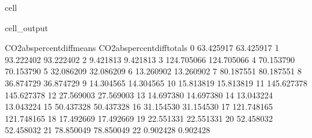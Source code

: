 \documentclass[letterpaper,10pt,english]{jupyterBook}
\begin{document}
\begin{sphinxuseclass}{cell}
\begin{sphinxVerbatimOutput}
\begin{sphinxuseclass}{cell_output}
\begin{sphinxVerbatim}[commandchars=\\\{\}]
    CO2\PYGZus{}abs\PYGZus{}percent\PYGZus{}diff\PYGZus{}means  CO2\PYGZus{}abs\PYGZus{}percent\PYGZus{}diff\PYGZus{}totals  \PYGZbs{}
0                    63.425917                    63.425917   
1                    93.222402                    93.222402   
2                     9.421813                     9.421813   
3                   124.705066                   124.705066   
4                    70.153790                    70.153790   
5                    32.086209                    32.086209   
6                    13.260902                    13.260902   
7                    80.187551                    80.187551   
8                    36.874729                    36.874729   
9                    14.304565                    14.304565   
10                   15.813819                    15.813819   
11                  145.627378                   145.627378   
12                   27.569003                    27.569003   
13                   14.697380                    14.697380   
14                   13.043224                    13.043224   
15                   50.437328                    50.437328   
16                   31.154530                    31.154530   
17                  121.748165                   121.748165   
18                   17.492669                    17.492669   
19                   22.551331                    22.551331   
20                   52.458032                    52.458032   
21                   78.850049                    78.850049   
22                    0.902428                     0.902428   


\end{sphinxVerbatim}
\end{sphinxuseclass}
\end{sphinxVerbatimOutput}
\end{sphinxuseclass}
\end{document}
